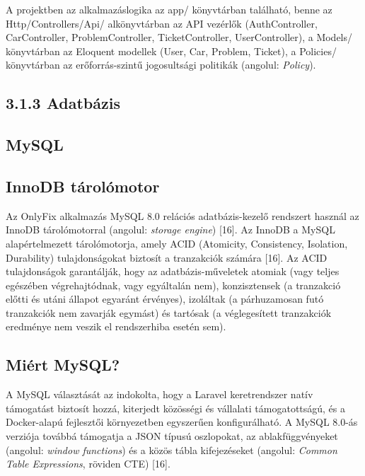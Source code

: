 A projektben az alkalmazáslogika az app/ könyvtárban található, benne az Http/Controllers/Api/ alkönyvtárban az API vezérlők (AuthController, CarController, ProblemController, TicketController, UserController), a Models/ könyvtárban az Eloquent modellek (User, Car, Problem, Ticket), a Policies/ könyvtárban az erőforrás-szintű jogosultsági politikák (angolul: \emph{Policy}).

\subsection{3.1.3 Adatbázis}\label{adatbuxe1zis}

\subsection{MySQL}\label{mysql}

\subsection{InnoDB tárolómotor}\label{innodb-tuxe1roluxf3motor}

Az OnlyFix alkalmazás MySQL 8.0 relációs adatbázis-kezelő rendszert használ az InnoDB tárolómotorral (angolul: \emph{storage engine}) {[}16{]}. Az InnoDB a MySQL alapértelmezett tárolómotorja, amely ACID (Atomicity, Consistency, Isolation, Durability) tulajdonságokat biztosít a tranzakciók számára {[}16{]}. Az ACID tulajdonságok garantálják, hogy az adatbázis-műveletek atomiak (vagy teljes egészében végrehajtódnak, vagy egyáltalán nem), konzisztensek (a tranzakció előtti és utáni állapot egyaránt érvényes), izoláltak (a párhuzamosan futó tranzakciók nem zavarják egymást) és tartósak (a véglegesített tranzakciók eredménye nem veszik el rendszerhiba esetén sem).

\subsection{Miért MySQL?}\label{miuxe9rt-mysql}

A MySQL választását az indokolta, hogy a Laravel keretrendszer natív támogatást biztosít hozzá, kiterjedt közösségi és vállalati támogatottságú, és a Docker-alapú fejlesztői környezetben egyszerűen konfigurálható. A MySQL 8.0-ás verziója továbbá támogatja a JSON típusú oszlopokat, az ablakfüggvényeket (angolul: \emph{window functions}) és a közös tábla kifejezéseket (angolul: \emph{Common Table Expressions}, röviden CTE) {[}16{]}.

